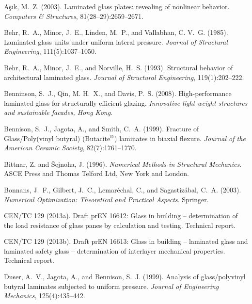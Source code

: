 \documentclass[11pt]{article}
\begin{document}
\begin{thebibliography}{10}

A\c{s}\i{}k, M.~Z. (2003).
Laminated glass plates: revealing of nonlinear behavior.
{\em Computers \& Structures}, 81(28--29):2659--2671.

Behr, R.~A., Minor, J.~E., Linden, M.~P., and Vallabhan, C. V.~G. (1985).
Laminated glass units under uniform lateral pressure.
{\em Journal of Structural Engineering}, 111(5):1037--1050.

Behr, R.~A., Minor, J.~E., and Norville, H.~S. (1993).
Structural behavior of architectural laminated glass.
{\em Journal of Structural Engineering}, 119(1):202--222.

Benninson, S.~J., Qin, M. H.~X., and Davis, P.~S. (2008).
High-performance laminated glass for structurally efficient glazing.
{\em Innovative light-weight structures and sustainable facades, Hong
  Kong}.

Bennison, S.~J., Jagota, A., and Smith, C.~A. (1999).
Fracture of {Glass/Poly(vinyl butyral)
  (Butacite$^\text{\textregistered}$)} laminates in biaxial flexure.
{\em Journal of the American Ceramic Society}, 82(7):1761--1770.

Bittnar, Z. and \v{S}ejnoha, J. (1996).
{\em Numerical Methods in Structural Mechanics}.
ASCE Press and Thomas Telford Ltd, New York and London.

Bonnans, J.~F., Gilbert, J.~C., Lemar\'{e}chal, C., and Sagastiz\'{a}bal, C.~A.
  (2003).
{\em Numerical Optimization: {Theoretical} and Practical Aspects}.
Springer.

{CEN/TC 129} (2013a).
Draft {prEN} 16612: Glass in building -- determination of the load
  resistance of glass panes by calculation and testing.
Technical report.

{CEN/TC 129} (2013b).
Draft {prEN} 16613: Glass in building -- laminated glass and
  laminated safety glass -- determination of interlayer mechanical properties.
Technical report.

Duser, A.~V., Jagota, A., and Bennison, S.~J. (1999).
Analysis of glass/polyvinyl butyral laminates subjected to uniform
  pressure.
{\em Journal of Engineering Mechanics}, 125(4):435--442.


\end{thebibliography}
\end{document}
